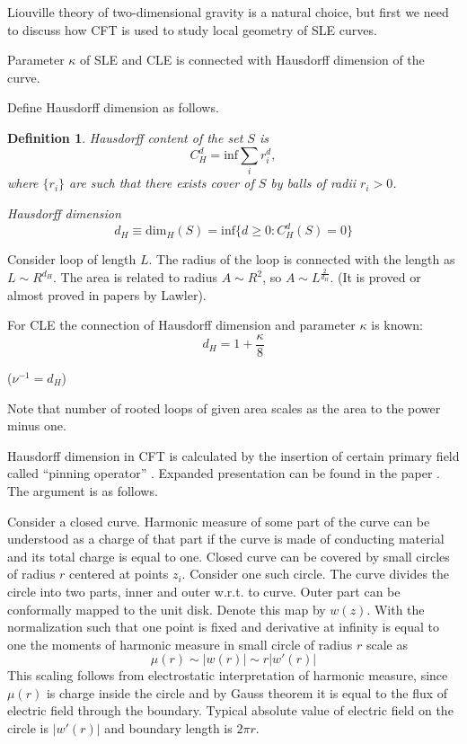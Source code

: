 \documentclass[12pt]{article}
\newtheorem{definition}{Definition}
\begin{document}
Liouville theory of two-dimensional gravity is a natural choice, but first we need to discuss
how CFT is used to study local geometry of SLE curves. 

Parameter $\kappa$ of SLE and CLE is connected with Hausdorff dimension of the curve. 


Define Hausdorff dimension as follows.
\begin{definition}
  {\it Hausdorff content} of the set $S$ is
  \begin{equation}
    \label{eq:3}
    C^d_H = \mathrm{inf} \sum_i r_i^d,
  \end{equation}
  where $\{r_i\}$ are such that there exists cover of $S$ by balls of
  radii $r_i>0$. 

  {\it Hausdorff dimension}
  \begin{equation}
    \label{eq:4}
    d_H\equiv\mathrm{dim}_H(S) = \mathrm{inf}\{ d\geq 0: C^d_H(S)=0\}
  \end{equation}
\end{definition}


Consider loop of length $L$. The radius of the loop is connected with
the length as $L\sim R^{d_H}$. The area is related to radius $A\sim
R^2$, so $A\sim L^{\frac{2}{d_H}}$.
(It is proved or almost proved in papers by Lawler).

For CLE the connection of Hausdorff dimension and parameter $\kappa$
is known:
\begin{equation}
  \label{eq:5}
  d_H=1+\frac{\kappa}{8}
\end{equation}

($\nu^{-1}=d_H$)

Note that number of rooted loops of given area scales as the area to
the power minus one. 

Hausdorff dimension in CFT is calculated by the insertion of certain primary field called ``pinning
operator'' \cite{bettelheim2005harmonic}. Expanded presentation can be found in the paper
\cite{gruzberg2006stochastic}. The argument is as follows. 

Consider a closed curve. Harmonic measure of some part of the curve can be understood as a charge of
that part if the curve is made of conducting material and its total charge is equal to one. 
Closed curve can be covered by small circles of radius $r$ centered at points
$z_{i}$. Consider one such circle. The curve divides the circle into two parts, inner and outer
w.r.t. to curve. Outer part can be conformally mapped to the unit disk. Denote this map by $w(z)$.
With the normalization such that one point is fixed and derivative at infinity is equal to one the
moments of harmonic measure in small circle of radius $r$ scale as
\begin{equation}
  \label{eq:116}
  \mu(r)\sim |w(r)|\sim r |w'(r)|
\end{equation}
This scaling follows from electrostatic interpretation of harmonic measure, since $\mu(r)$ is charge
inside the circle and by Gauss theorem it is equal to the flux of electric field through the
boundary. Typical absolute value of electric field on the circle is $|w'(r)|$ and boundary length is
$2\pi r$.
\end{document}
